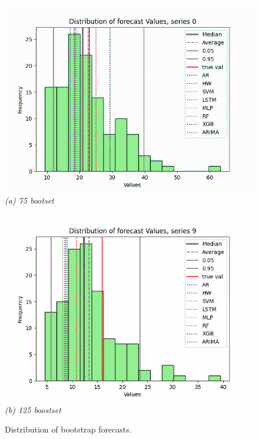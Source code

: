 \documentclass[ijoc,sglanonrev]{informs4}
\begin{document}
\begin{figure}[ht]
\centering
\begin{minipage}{0.48\textwidth}
    \centering
    \includegraphics[width=\linewidth]{distr_75_0.png}
    \label{fig:dista}%
    \vspace{0.5em}
    \textit{(a) 75 bootset}
\end{minipage}
\hfill
\begin{minipage}{0.48\textwidth}
    \centering
    \includegraphics[width=\linewidth]{distr_75_9.png}
    \label{fig:distb}%
    \vspace{0.5em}
    \textit{(b) 125 boostset}
\end{minipage}
\caption{Distribution of bootstrap forecasts.}
\label{fig:distr}
\end{figure}
\end{document}
